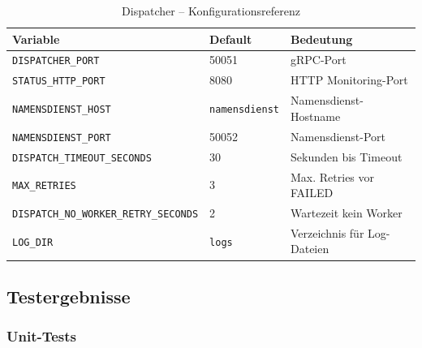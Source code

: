 \begin{table}[H]
\centering
\begin{tabular}{lll}
\toprule
\textbf{Variable} & \textbf{Default} & \textbf{Bedeutung} \\
\midrule
\texttt{DISPATCHER\_PORT}                    & 50051             & gRPC-Port \\
\texttt{STATUS\_HTTP\_PORT}                  & 8080              & HTTP Monitoring-Port \\
\texttt{NAMENSDIENST\_HOST}                  & \texttt{namensdienst} & Namensdienst-Hostname \\
\texttt{NAMENSDIENST\_PORT}                  & 50052             & Namensdienst-Port \\
\texttt{DISPATCH\_TIMEOUT\_SECONDS}          & 30                & Sekunden bis Timeout \\
\texttt{MAX\_RETRIES}                        & 3                 & Max. Retries vor FAILED \\
\texttt{DISPATCH\_NO\_WORKER\_RETRY\_SECONDS} & 2                & Wartezeit kein Worker \\
\texttt{LOG\_DIR}                            & \texttt{logs}     & Verzeichnis für Log-Dateien \\
\bottomrule
\end{tabular}
\caption{Dispatcher -- Konfigurationsreferenz}
\end{table}

\subsection{Testergebnisse}

\subsubsection*{Unit-Tests}

